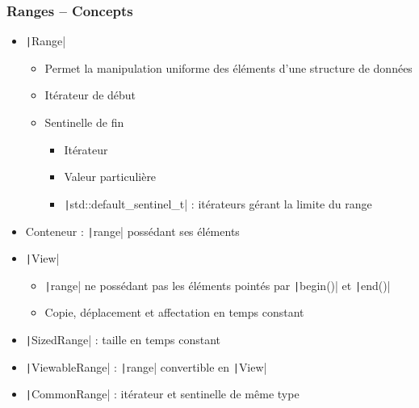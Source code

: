 \documentclass[C++.tex]{subfiles}
\begin{document}
\begin{frame}[fragile]
	\frametitle{Ranges -- Concepts}
	\begin{itemize}
		\item \texttt|Range|
		\begin{itemize}
			\item Permet la manipulation uniforme des éléments d'une structure de données
			\item Itérateur de début
			\item Sentinelle de fin
			\begin{itemize}
				\item Itérateur
				\item Valeur particulière
				\item \texttt|std::default_sentinel_t| : itérateurs gérant la limite du range

			\end{itemize}
		\end{itemize}

		\item Conteneur : \texttt|range| possédant ses éléments
		\item \texttt|View|
		\begin{itemize}
			\item \texttt|range| ne possédant pas les éléments pointés par \texttt|begin()| et \texttt|end()|
			\item Copie, déplacement et affectation en temps constant
		\end{itemize}
		\item \texttt|SizedRange| : taille en temps constant
		\item \texttt|ViewableRange| : \texttt|range| convertible en \texttt|View|
		\item \texttt|CommonRange| : itérateur et sentinelle de même type
	\end{itemize}
\end{frame}
\end{document}
